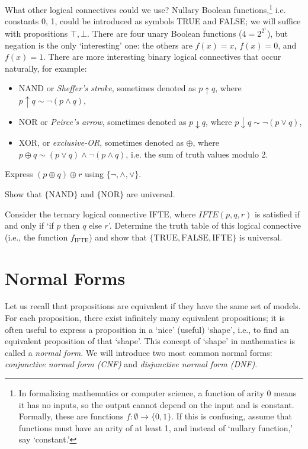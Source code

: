 What other logical connectives could we use? Nullary Boolean functions,\footnote{In formalizing mathematics or computer science, a function of arity 0 means it has no inputs, so the output cannot depend on the input and is constant. Formally, these are functions $f\colon \emptyset\to \{0,1\}$. If this is confusing, assume that functions must have an arity of at least 1, and instead of `nullary function,' say `constant.'} i.e. constants 0, 1, could be introduced as symbols TRUE and FALSE; we will suffice with propositions $\top, \bot$. There are four unary Boolean functions ($4 = 2^{2^1}$), but negation is the only `interesting' one: the others are $f(x) = x$, $f(x) = 0$, and $f(x) = 1$. There are more interesting binary logical connectives that occur naturally, for example:
\begin{itemize}
    \item NAND or \emph{Sheffer's stroke}, sometimes denoted as $p \uparrow q$, where $p \uparrow q \sim \neg (p \land q)$,
    \item NOR or \emph{Peirce's arrow}, sometimes denoted as $p \downarrow q$, where $p \downarrow q \sim \neg (p \lor q)$,
    \item XOR, or \emph{exclusive-OR}, sometimes denoted as $\oplus$, where $p \oplus q \sim (p \lor q) \land \neg (p \land q)$, i.e. the sum of truth values modulo 2.
\end{itemize}

\begin{exercise}
    Express $(p \oplus q) \oplus r$ using $\{\neg, \land, \lor\}$.
\end{exercise}

\begin{exercise}
    Show that $\{\mathrm{NAND}\}$ and $\{\mathrm{NOR}\}$ are universal.
\end{exercise}

\begin{exercise}
Consider the ternary logical connective $\mathrm{IFTE}$, where $IFTE(p,q,r)$ is satisfied if and only if `if $p$ then $q$ else $r$'. Determine the truth table of this logical connective (i.e., the function $f_\mathrm{IFTE}$) and show that $\{\mathrm{TRUE}, \mathrm{FALSE}, \mathrm{IFTE}\}$ is universal.
\end{exercise}


\section{Normal Forms}

Let us recall that propositions are equivalent if they have the same set of models. For each proposition, there exist infinitely many equivalent propositions; it is often useful to express a proposition in a `nice' (useful) `shape', i.e., to find an equivalent proposition of that `shape'. This concept of `shape' in mathematics is called a \emph{normal form}. We will introduce two most common normal forms: \emph{conjunctive normal form (CNF)} and \emph{disjunctive normal form (DNF)}.


